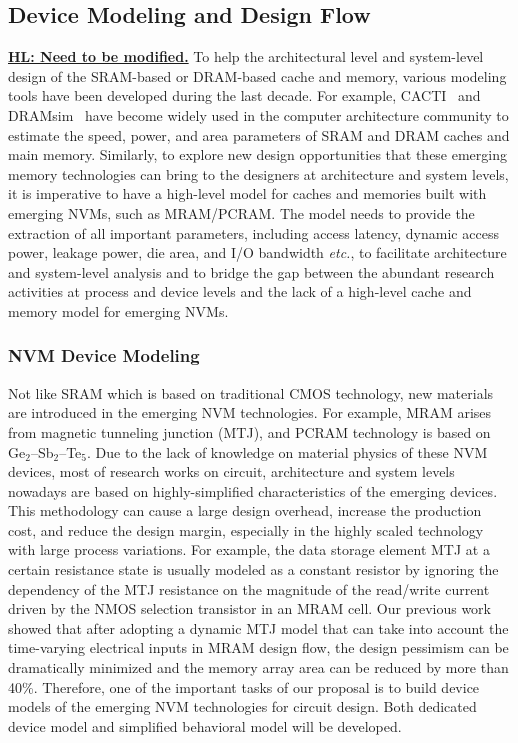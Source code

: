 
\subsection{Device Modeling and Design Flow}

\textbf{\underline{HL: Need to be modified.}}
To help the architectural level and system-level design of
the SRAM-based or DRAM-based cache and memory, various
modeling tools have been developed during the last decade. For
example, CACTI~\cite{CACTI:NORM,PRAM:EVANS,PRAM:eCACTI,PRAM:CACTI60} and
DRAMsim~\cite{DRAMsim} have become widely used in the
computer architecture community to estimate the speed, power, and
area parameters of SRAM and DRAM caches and main memory.
Similarly, to explore new design opportunities that these emerging
memory technologies can bring to the designers at architecture and
system levels, it is imperative to have a high-level model
for caches and memories built with emerging NVMs, such as MRAM/PCRAM.
The model needs to provide the extraction of all important parameters, including access latency, dynamic access power, leakage power, die area, and I/O bandwidth \emph{etc.}, to facilitate architecture and system-level analysis and to bridge the gap between the abundant research activities at process and device levels and the lack of a high-level cache and memory model for emerging NVMs.

\subsubsection{NVM Device Modeling}

Not like SRAM which is based on traditional CMOS technology, new materials are introduced in the emerging NVM technologies. For example, MRAM arises from magnetic tunneling junction (MTJ), and PCRAM technology is based on Ge$_2$--Sb$_2$--Te$_5$.
Due to the lack of knowledge on material physics of these NVM devices, most of research works on circuit, architecture and system levels nowadays are based on highly-simplified characteristics of the emerging devices. This methodology can cause a large design overhead, increase the production cost, and reduce the design margin, especially in the highly scaled technology with large process variations.  For example, the data storage element MTJ at a certain resistance state is usually modeled as a constant resistor by ignoring the dependency of the MTJ resistance on the magnitude of the read/write current driven by the NMOS selection transistor in an MRAM cell. Our previous work~\cite{Chen08} showed that after adopting a dynamic MTJ model that can take into account the time-varying electrical inputs in MRAM design flow, the design pessimism can be dramatically minimized and the memory array area can be reduced by more than 40\%. Therefore, one of the important tasks of our proposal is to build device models of the emerging NVM technologies for circuit design. Both dedicated device model and simplified behavioral model will be developed.

